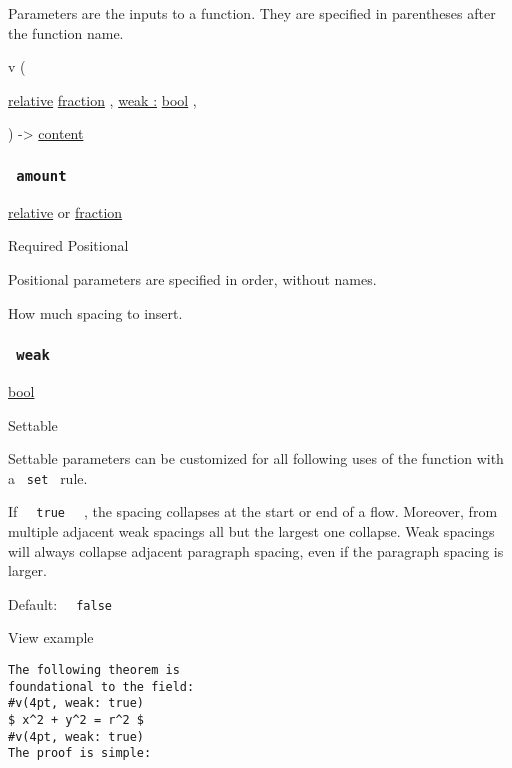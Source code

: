 \label{parameters-tooltip}
Parameters are the inputs to a function. They are specified in
parentheses after the function name.

{ v } (

{ \href{/docs/reference/layout/relative/}{relative}
\href{/docs/reference/layout/fraction/}{fraction} , } {
\hyperref[parameters-weak]{weak :}
\href{/docs/reference/foundations/bool/}{bool} , }

) -\textgreater{} \href{/docs/reference/foundations/content/}{content}

\subsubsection{\texorpdfstring{\texttt{\ amount\ }}{ amount }}\label{parameters-amount}

\href{/docs/reference/layout/relative/}{relative} {or}
\href{/docs/reference/layout/fraction/}{fraction}

{Required} {{ Positional }}

\label{parameters-amount-positional-tooltip}
Positional parameters are specified in order, without names.

How much spacing to insert.

\subsubsection{\texorpdfstring{\texttt{\ weak\ }}{ weak }}\label{parameters-weak}

\href{/docs/reference/foundations/bool/}{bool}

{{ Settable }}

\label{parameters-weak-settable-tooltip}
Settable parameters can be customized for all following uses of the
function with a \texttt{\ set\ } rule.

If \texttt{\ }{\texttt{\ true\ }}\texttt{\ } , the spacing collapses at
the start or end of a flow. Moreover, from multiple adjacent weak
spacings all but the largest one collapse. Weak spacings will always
collapse adjacent paragraph spacing, even if the paragraph spacing is
larger.

Default: \texttt{\ }{\texttt{\ false\ }}\texttt{\ }


View example

\begin{verbatim}
The following theorem is
foundational to the field:
#v(4pt, weak: true)
$ x^2 + y^2 = r^2 $
#v(4pt, weak: true)
The proof is simple:
\end{verbatim}


